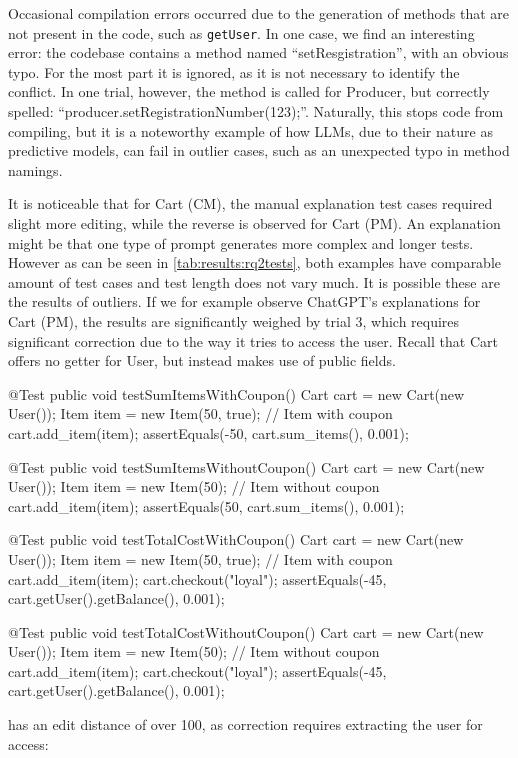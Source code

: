 Occasional compilation errors occurred due to the generation of methods that are not present in the code, such as \texttt{getUser}.
In one case, we find an interesting error: the codebase contains a method named ``setResgistration'', with an obvious typo.
For the most part it is ignored, as it is not necessary to identify the conflict. In one trial, however,
the method is called for Producer, but correctly spelled: ``producer.setRegistrationNumber(123);''.
Naturally, this stops code from compiling, but it is a noteworthy example of how LLMs, due to their nature as
predictive models, can fail in outlier cases, such as an unexpected typo in method namings.

It is noticeable that for Cart (CM), the manual explanation test cases required slight more editing, while the reverse
is observed for Cart (PM). An explanation might be that one type of prompt generates more complex and longer tests. However as can be seen in
\cref{tab:results:rq2tests}, both examples have comparable amount of test cases and test length does not vary much.
It is possible these are the results of outliers. If we for example observe ChatGPT's explanations for Cart (PM), the results are significantly weighed by
trial 3, which requires significant correction due to the way it tries to access the user. Recall that Cart offers no getter for User, but instead makes use
of public fields.
\begin{response}
@Test
public void testSumItemsWithCoupon() {
    Cart cart = new Cart(new User());
    Item item = new Item(50, true); // Item with coupon
    cart.add_item(item);
    assertEquals(-50, cart.sum_items(), 0.001);
}

@Test
public void testSumItemsWithoutCoupon() {
    Cart cart = new Cart(new User());
    Item item = new Item(50); // Item without coupon
    cart.add_item(item);
    assertEquals(50, cart.sum_items(), 0.001);
}

@Test
public void testTotalCostWithCoupon() {
    Cart cart = new Cart(new User());
    Item item = new Item(50, true); // Item with coupon
    cart.add_item(item);
    cart.checkout("loyal");
    assertEquals(-45, cart.getUser().getBalance(), 0.001);
}

@Test
public void testTotalCostWithoutCoupon() {
    Cart cart = new Cart(new User());
    Item item = new Item(50); // Item without coupon
    cart.add_item(item);
    cart.checkout("loyal");
    assertEquals(-45, cart.getUser().getBalance(), 0.001);
}
\end{response}
has an edit distance of over 100, as correction requires extracting the user for access:
